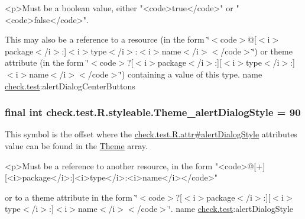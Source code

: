 \begin{DoxyVerb}      <p>Must be a boolean value, either "<code>true</code>" or "<code>false</code>".
\end{DoxyVerb}
 

This may also be a reference to a resource (in the form \char`\"{}$<$code$>$@\mbox{[}$<$i$>$package$<$/i$>$\+:\mbox{]}$<$i$>$type$<$/i$>$\+:$<$i$>$name$<$/i$>$$<$/code$>$\char`\"{}) or theme attribute (in the form \char`\"{}$<$code$>$?\mbox{[}$<$i$>$package$<$/i$>$\+:\mbox{]}\mbox{[}$<$i$>$type$<$/i$>$\+:\mbox{]}$<$i$>$name$<$/i$>$$<$/code$>$\char`\"{}) containing a value of this type.  name \hyperlink{namespacecheck_1_1test}{check.\+test}\+:alert\+Dialog\+Center\+Buttons \hypertarget{classcheck_1_1test_1_1_r_1_1styleable_ab1ac7d03d2b00801128e1263f5826e5c}{}
\subsubsection[{Theme\+\_\+alert\+Dialog\+Style}]{\setlength{\rightskip}{0pt plus 5cm}final int check.\+test.\+R.\+styleable.\+Theme\+\_\+alert\+Dialog\+Style = 90\hspace{0.3cm}{\ttfamily [static]}}\label{classcheck_1_1test_1_1_r_1_1styleable_ab1ac7d03d2b00801128e1263f5826e5c}
This symbol is the offset where the \hyperlink{classcheck_1_1test_1_1_r_1_1attr_a266f3305ed6d39e276ec791931594f34}{check.\+test.\+R.\+attr\#alert\+Dialog\+Style} attribute\textquotesingle{}s value can be found in the \hyperlink{classcheck_1_1test_1_1_r_1_1styleable_acca726d02016a0cf607782ec3a436a81}{Theme} array.

\begin{DoxyVerb}      <p>Must be a reference to another resource, in the form "<code>@[+][<i>package</i>:]<i>type</i>:<i>name</i></code>"
\end{DoxyVerb}
 or to a theme attribute in the form \char`\"{}$<$code$>$?\mbox{[}$<$i$>$package$<$/i$>$\+:\mbox{]}\mbox{[}$<$i$>$type$<$/i$>$\+:\mbox{]}$<$i$>$name$<$/i$>$$<$/code$>$\char`\"{}.  name \hyperlink{namespacecheck_1_1test}{check.\+test}\+:alert\+Dialog\+Style \hypertarget{classcheck_1_1test_1_1_r_1_1styleable_ac9de00117911739b0431126a81b708d4}{}
